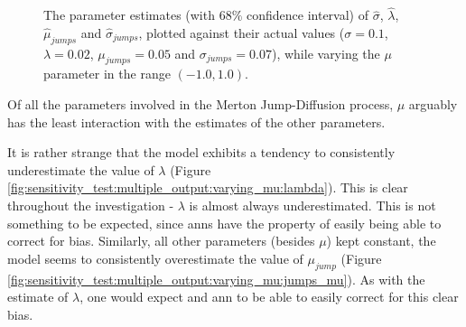 \documentclass[11pt,oneside,openany,a4paper,english, report, goldenblock
]{usthesis}
\begin{document}
\begin{figure}[h]
{\begin{subfloatrow}
	\end{subfloatrow}}{
		\caption{The parameter estimates (with $68\%$ confidence interval) of $\hat{\sigma}$, $\hat{\lambda}$, $\hat{\mu}_{jumps}$ and $\hat{\sigma}_{jumps}$, plotted against their actual values ($\sigma = 0.1$, $\lambda = 0.02$, $\mu_{jumps} = 0.05$ and $\sigma_{jumps} = 0.07$), while varying the $\mu$ parameter in the range $\left(-1.0, 1.0\right)$.}
		\label{fig:sensitivity_test:multiple_output:varying_mu}}
\end{figure}
Of all the parameters involved in the Merton Jump-Diffusion process, $\mu$ arguably has the least interaction with the estimates of the other parameters. 

It is rather strange that the model exhibits a tendency to consistently underestimate the value of $\lambda$ (Figure \ref{fig:sensitivity_test:multiple_output:varying_mu:lambda}). This is clear throughout the investigation - $\lambda$ is almost always underestimated. This is not something to be expected, since \acrshort{ann}s have the property of easily being able to correct for bias.
Similarly, all other parameters (besides $\mu$) kept constant, the model seems to consistently overestimate the value of $\mu_{jump}$ (Figure \ref{fig:sensitivity_test:multiple_output:varying_mu:jumps_mu}). As with the estimate of $\lambda$, one would expect and \acrshort{ann} to be able to easily correct for this clear bias.
\end{document}

